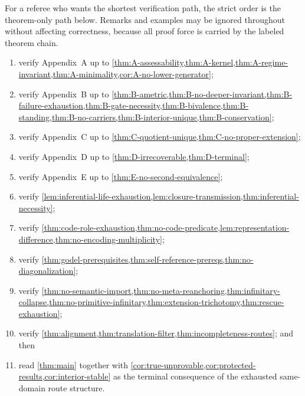 \documentclass[11pt]{article}
\theoremstyle{plain}
\theoremstyle{definition}
\begin{document}
For a referee who wants the shortest verification path, the strict order is the theorem-only path below. Remarks and examples may be ignored throughout without affecting correctness, because all proof force is carried by the labeled theorem chain.
\begin{enumerate}[label=(\arabic*), leftmargin=2.5em]
    \item verify Appendix~A up to \cref{thm:A-assessability,thm:A-kernel,thm:A-regime-invariant,thm:A-minimality,cor:A-no-lower-generator};
    \item verify Appendix~B up to \cref{thm:B-ametric,thm:B-no-deeper-invariant,thm:B-failure-exhaustion,thm:B-gate-necessity,thm:B-bivalence,thm:B-standing,thm:B-no-carriers,thm:B-interior-unique,thm:B-conservation};
    \item verify Appendix~C up to \cref{thm:C-quotient-unique,thm:C-no-proper-extension};
    \item verify Appendix~D up to \cref{thm:D-irrecoverable,thm:D-terminal};
    \item verify Appendix~E up to \cref{thm:E-no-second-equivalence};
    \item verify \cref{lem:inferential-life-exhaustion,lem:closure-transmission,thm:inferential-necessity};
    \item verify \cref{thm:code-role-exhaustion,thm:no-code-predicate,lem:representation-difference,thm:no-encoding-multiplicity};
    \item verify \cref{thm:godel-prerequisites,thm:self-reference-prereqs,thm:no-diagonalization};
    \item verify \cref{thm:no-semantic-import,thm:no-meta-reanchoring,thm:infinitary-collapse,thm:no-primitive-infinitary,thm:extension-trichotomy,thm:rescue-exhaustion};
    \item verify \cref{thm:alignment,thm:translation-filter,thm:incompleteness-routes}; and then
    \item read \cref{thm:main} together with \cref{cor:true-unprovable,cor:protected-results,cor:interior-stable} as the terminal consequence of the exhausted same-domain route structure.
\end{enumerate}
\end{document}
